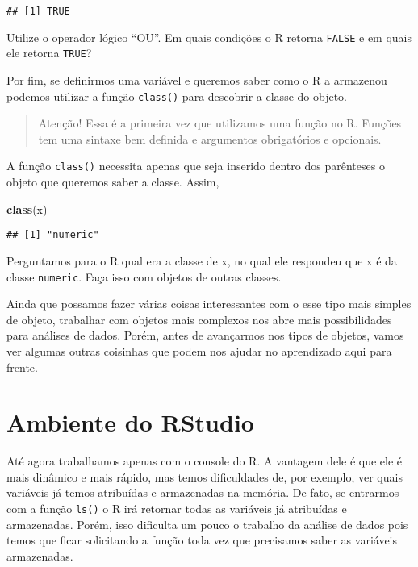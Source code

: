 \documentclass[]{book}
\newenvironment{Shaded}{\begin{snugshade}}{\end{snugshade}}
\newcommand{\KeywordTok}[1]{\textcolor[rgb]{0.13,0.29,0.53}{\textbf{#1}}}
\newcommand{\NormalTok}[1]{#1}
\theoremstyle{definition}
\theoremstyle{definition}
\theoremstyle{definition}
\theoremstyle{remark}
\let\BeginKnitrBlock\begin \let\EndKnitrBlock\end
\begin{document}
\begin{verbatim}
## [1] TRUE
\end{verbatim}

\BeginKnitrBlock{exercise}
\protect\hypertarget{exr:unnamed-chunk-17}{}{\label{exr:unnamed-chunk-17} }Utilize o operador lógico ``OU''. Em quais condições o R retorna \texttt{FALSE} e em quais ele retorna \texttt{TRUE}?
\EndKnitrBlock{exercise}

Por fim, se definirmos uma variável e queremos saber como o R a armazenou podemos utilizar a função \texttt{class()} para descobrir a classe do objeto.

\begin{quote}
Atenção! Essa é a primeira vez que utilizamos uma função no R. Funções tem uma sintaxe bem definida e argumentos obrigatórios e opcionais.
\end{quote}

A função \texttt{class()} necessita apenas que seja inserido dentro dos parênteses o objeto que queremos saber a classe. Assim,

\begin{Shaded}
\begin{Highlighting}[]
\KeywordTok{class}\NormalTok{(x)}
\end{Highlighting}
\end{Shaded}

\begin{verbatim}
## [1] "numeric"
\end{verbatim}

Perguntamos para o R qual era a classe de x, no qual ele respondeu que x é da classe \texttt{numeric}. Faça isso com objetos de outras classes.

Ainda que possamos fazer várias coisas interessantes com o esse tipo mais simples de objeto, trabalhar com objetos mais complexos nos abre mais possibilidades para análises de dados. Porém, antes de avançarmos nos tipos de objetos, vamos ver algumas outras coisinhas que podem nos ajudar no aprendizado aqui para frente.

\hypertarget{ambiente-do-rstudio}{%
\section{Ambiente do RStudio}\label{ambiente-do-rstudio}}

Até agora trabalhamos apenas com o console do R. A vantagem dele é que ele é mais dinâmico e mais rápido, mas temos dificuldades de, por exemplo, ver quais variáveis já temos atribuídas e armazenadas na memória. De fato, se entrarmos com a função \texttt{ls()} o R irá retornar todas as variáveis já atribuídas e armazenadas. Porém, isso dificulta um pouco o trabalho da análise de dados pois temos que ficar solicitando a função toda vez que precisamos saber as variáveis armazenadas.
\end{document}

